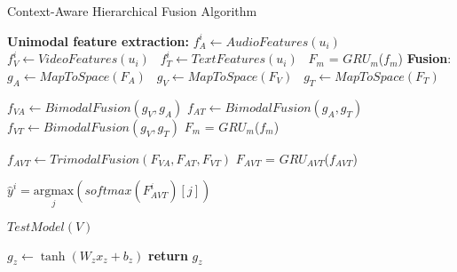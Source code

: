 \documentclass[review]{elsarticle}
\newcommand\?[1]{\hl{#1}}
\begin{document}
\begin{algorithm}[!ht]
    \small
    \caption{Context-Aware Hierarchical Fusion Algorithm}\label{algorithm}
    \begin{algorithmic}[1]
        
        
        \vspace{2mm}
        \vspace{2mm}
        \State \textbf{Unimodal feature extraction:}
            \State \texttt{$f_{A}^{i} \gets AudioFeatures(u_{i})$ }
            \State \texttt{$f_{V}^{i} \gets VideoFeatures(u_{i})$ }
            \State \texttt{$f_{T}^{i} \gets TextFeatures(u_{i})$ }
        \EndFor
            \State $F_m$ = $GRU_m$($f_m$)
        \EndFor
        \vspace{2mm}
        \State \textbf{Fusion}:
        \State \texttt{$g_{A} \gets MapToSpace(F_A)$ }
        \State \texttt{$g_{V} \gets MapToSpace(F_V)$ }
        \State \texttt{$g_{T} \gets MapToSpace(F_T)$ }

        \vspace{2mm}
        \State \texttt{$f_{VA} \gets BimodalFusion(g_V, g_A)$}
        \State \texttt{$f_{AT} \gets BimodalFusion(g_A, g_T)$}
        \State \texttt{$f_{VT} \gets BimodalFusion(g_V, g_T)$}
        \State $F_m$ = $GRU_m$($f_m$)
        \EndFor
        
        \vspace{2mm}
        \State $f_{AVT} \gets TrimodalFusion(F_{VA}, F_{AT}, F_{VT})$
        \State $F_{AVT}$ = $GRU_{AVT}$($f_{AVT}$)

        \vspace{2mm}
            \State $\hat{y}^i =\underset{j}{\text{argmax}}(softmax(F_{AVT}^i)[j])$ 
        \EndFor
        

        \State $TestModel(V)$
        \EndProcedure
        
        \vspace{2mm}
         
        \State $ g_z \gets \tanh(W_zx_z+b_z)  $
        \State \textbf{return} $g_z$
        \EndProcedure


\end{algorithmic}
\end{algorithm}
\end{document}
